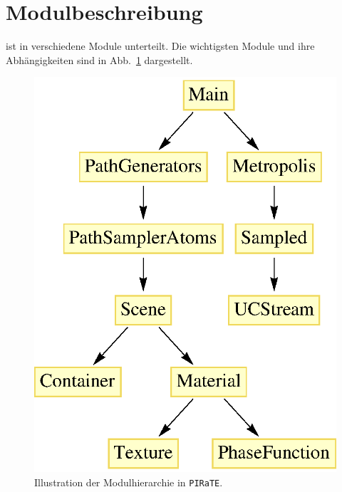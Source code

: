 	\section{Modulbeschreibung}
	
	\pirate ist in verschiedene Module unterteilt. Die wichtigsten Module und ihre Abhängigkeiten sind in Abb.~\ref{fig:moduleoverview} dargestellt.
		\begin{figure}
				\centering
				\includegraphics[height=0.3\textheight]{moduleoverview.eps}
				\caption{Illustration der Modulhierarchie in \texttt{PIRaTE}.}
				\label{fig:moduleoverview}
		\end{figure}
